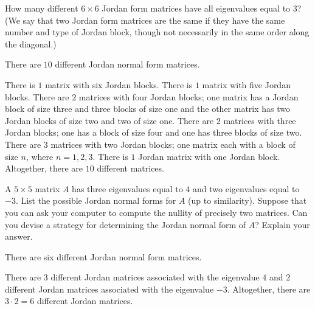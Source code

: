 \documentclass{ximera}
\begin{document}
\begin{exercise} \label{c10.5.2A}
How many different $6\times 6$ Jordan form matrices have all eigenvalues 
equal to $3$? (We say that two Jordan form matrices are the same 
if they have the same number and type of Jordan block, though not
necessarily in the same order along the diagonal.)

\begin{solution}
\ans There are $10$ different Jordan normal form matrices.

\soln  There is $1$ matrix with six Jordan blocks.  There is $1$ matrix with five
Jordan blocks.  There are $2$ matrices with four Jordan blocks; one matrix has a
Jordan block of size three and three blocks of size one and the other matrix has two
Jordan blocks of size two and two of size one.  There are $2$ matrices with three
Jordan blocks; one has a block of size four and one has three blocks of size two.
There are $3$ matrices with two Jordan blocks; one matrix each with a block of
size $n$, where $n=1,2,3$.  There is $1$ Jordan matrix with one Jordan block. 
Altogether, there are $10$ different matrices.

\end{solution}
\end{exercise}

\begin{exercise}  \label{c10.5.2B}
A $5\times 5$ matrix $A$ has three eigenvalues equal
to $4$ and two eigenvalues equal to $-3$.  List the possible Jordan normal 
forms for $A$ (up to similarity).  Suppose that you can ask your computer to
compute the nullity of precisely two matrices.  Can you devise a strategy for
determining the Jordan normal form of $A$?  Explain your answer.

\begin{solution}
\ans There are six different Jordan normal form matrices.

\soln  There are $3$ different Jordan matrices associated with the eigenvalue $4$ and
$2$ different Jordan matrices associated with the eigenvalue $-3$.  Altogether, there
are $3\cdot 2=6$ different Jordan matrices.


\end{solution}
\end{exercise}
\end{document}
